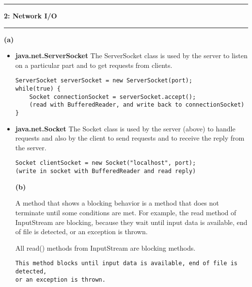 \documentclass[11pt]{article}
\newcommand\question[2]{\vspace{.25in}\hrule\textbf{#1: #2}\vspace{.5em}\hrule\vspace{.10in}}
\renewcommand\part[1]{\vspace{.10in}\textbf{(#1)}}
\begin{document}
\question{2}{Network I/O}

\part{a}


\begin{itemize}

	\item \textbf{java.net.ServerSocket} The ServerSocket class is used by the server to listen on a particular part and to get requests from clients.
	
\begin{small}
\begin{lstlisting}[frame=single]
ServerSocket serverSocket = new ServerSocket(port);
while(true) {
	Socket connectionSocket = serverSocket.accept();
	(read with BufferedReader, and write back to connectionSocket)
}
\end{lstlisting}
\end{small}

	\item \textbf{java.net.Socket} The Socket class is used by the server (above) to handle requests and also by the client to send requests and to receive the reply from the server.

\begin{small}
\begin{lstlisting}[frame=single]
Socket clientSocket = new Socket("localhost", port);
(write in socket with BufferedReader and read reply)
\end{lstlisting}
\end{small}

\part{b}

A method that shows a blocking behavior is a method that does not terminate until some conditions are met. For example, the read method of InputStream are blocking, because they wait until input data is available, end of file is detected, or an exception is thrown.

All read() methods from InputStream are blocking methods. 

\begin{small}
\begin{lstlisting}[frame=single]
This method blocks until input data is available, end of file is detected, 
or an exception is thrown.
\end{lstlisting}
\end{small}


\end{itemize}
\end{document}
